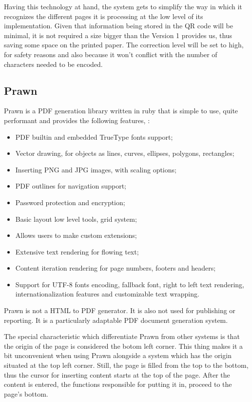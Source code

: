 Having this technology at hand, the system gets to simplify the way in which it recognizes the different pages it is processing at the low level of its implementation. Given that information being stored in the QR code will be minimal, it is not required a size bigger than the Version 1 provides us, thus saving some space on the printed paper. The correction level will be set to high, for safety reasons and also because it won’t conflict with the number of characters needed to be encoded.


\subsection{Prawn}
Prawn is a PDF generation library written in ruby that is simple to use, quite performant and provides the following features, \cite{prawn_doc}:

\begin{itemize} 
  \item PDF builtin and embedded TrueType fonts support;
  \item Vector drawing, for objects as lines, curves, ellipses, polygons, rectangles;
  \item Inserting PNG and JPG images, with scaling options;
  \item PDF outlines for navigation support;
  \item Password protection and encryption;
  \item Basic layout low level tools, grid system;
  \item Allows users to make custom extensions;
  \item Extensive text rendering for flowing text;
  \item Content iteration rendering for page numbers, footers and headers;
  \item Support for UTF-8 fonts encoding, fallback font, right to left text rendering, internationalization features and customizable text wrapping.
\end{itemize}

Prawn is not a HTML to PDF generator. It is also not used for publishing or reporting. It is a particularly adaptable PDF document generation system. 

The special characteristic which differentiate Prawn from other systems is that the origin of the page is considered the botom left corner. This thing makes it a bit unconvenient when using Prawn alongside a system which has the origin situated at the top left corner. Still, the page is filled from the top to the bottom, thus the cursor for inserting content starts at the top of the page. After the content is entered, the functions responsible for putting it in, proceed to the page's bottom.

